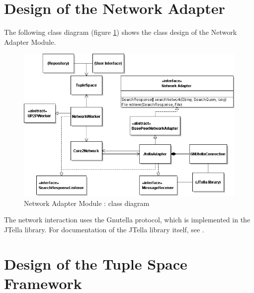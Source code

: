 \documentclass[titlepage]{article}%
\begin{document}
\section{Design of the Network Adapter}
\label{sec:NetworkAdapterDesign}

The following class diagram (figure \ref{fig:NAClass}) shows the class design of the Network Adapter Module.
\begin{figure}[htb]
\centering
	\includegraphics[scale=0.5]{diagrams/UP2PNetworkAdapterClasses.png}
	\caption{Network Adapter Module : class diagram}
	\label{fig:NAClass}
\end{figure}

The network interaction uses the Gnutella protocol, which is implemented in the JTella library. For documentation of the JTella library itself, see \cite{jtellaDoc}.


\section{Design of the Tuple Space Framework}
\label{sec:TSDesign}
\end{document}
